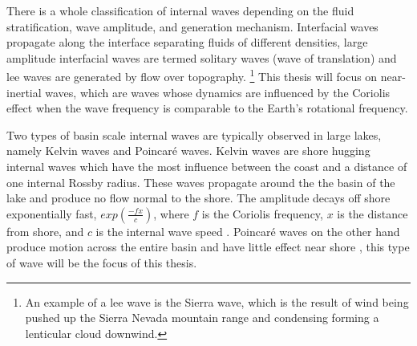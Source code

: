 There is a whole classification of internal waves depending on the fluid stratification, wave amplitude, and generation mechanism. Interfacial
waves propagate along the interface separating fluids of different densities, large amplitude interfacial waves are termed solitary waves (wave of translation) and 
lee waves are generated by flow over topography. \footnote{An example of a lee wave is the Sierra wave, which is the result of wind being pushed up the Sierra Nevada mountain range 
and condensing forming a lenticular cloud downwind.} This thesis will focus on near-inertial waves, which are waves
whose dynamics are influenced by the Coriolis effect when the wave frequency is comparable to the Earth's rotational frequency. 

Two types of basin scale internal waves are typically observed in large lakes, namely Kelvin waves and Poincar\'{e} waves. Kelvin waves are shore hugging
internal waves which have the most influence between the coast and a distance of one internal Rossby radius.  These waves propagate around the the basin of the lake
and produce no flow normal to the shore. The amplitude decays off shore exponentially fast, $exp(\frac{-fx}{c})$, where $f$ is the Coriolis frequency, $x$ is the distance from shore, and $c$ is the internal wave speed \citep{mortimer_1974}. Poincar\'{e} waves on the other hand produce motion
across the entire basin and have little effect near shore \citep{antenucci2001energetics}, this type of wave will be the focus of this thesis.



